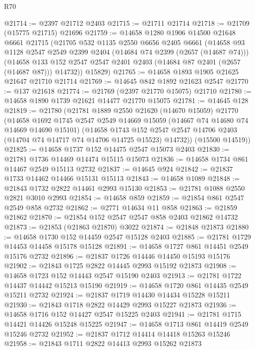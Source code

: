 \begin{lexlean}{R70}
\begin{coremodule}
@21714 := @2397 @21712 @2403
@21715 := @21711 @21714
@21718 := @21709 (@15775 @21715) @21696
@21759 := @14658
    @1280
    @1906
    @14500
    @21648
    @6661
    @21715
    (@21705
      @532
      @1135
      @2550
      @6656
      @2405
      @6661
      (@14658
        @93
        @1128
        @2547
        @2549
        @2399
        @2404
        (@14684 @74 @2399 (@2657 (@14687 @74)))
        (@14658 @133 @152 @2547 @2547 @2401 @2403 (@14684 @87 @2401 (@2657 (@14687 @87))) @14732))
      @15829)
@21765 := @14658 @1893 @1905 @21625 @21647 @21710 @21714
@21769 := @14645 @842 @1892 @21623 @2547
@21770 := @137 @21618
@21774 := @21769 (@2397 @21770 @15075) @21710
@21780 := @14658 @1890 @1739 @21621 @14477 @21770 @15075
@21781 := @14645 @128
@21819 := @21780
    (@21781
      @1889
      @2550
      @21620
      (@14670 @15059)
      @21770
      (@14658
        @1692
        @1745
        @2547
        @2549
        @14669
        @15059
        (@14667 @74 @14680 @74 @14669 @14690 @15101)
        (@14658
          @1743
          @152
          @2547
          @2547
          @14706
          @2403
          (@14704 @74 @14717 @74 @14706 @14725 @15523)
          @14732))
      (@15500 @14519))
@21825 := @14658 @1737 @152 @14475 @2547 @15073 @2403
@21830 := @21781 @1736 @14469 @14474 @15115 @15073
@21836 := @14658 @1734 @861 @14467 @2549 @15113 @2732
@21837 := @14645 @924
@21842 := @21837 @1733 @14462 @14466 @15131 @15113
@21843 := @14658 @1089
@21848 := @21843 @1732 @2822 @14461 @2993 @15130
@21853 := @21781 @1088 @2550 @2821 @3010 @2993
@21854 := @14658 @859
@21859 := @21854 @861 @2547 @2549 @858 @2732
@21862 := @2771 @14634 @11 @858
@21863 := @21859 @21862
@21870 := @21854 @152 @2547 @2547 @858 @2403 @21862 @14732
@21873 := @21853 (@21863 @21870) @3022
@21874 := @21848 @21873
@21880 := @14658 @1730 @152 @14459 @2547 @15128 @2403
@21885 := @21781 @1729 @14453 @14458 @15178 @15128
@21891 := @14658 @1727 @861 @14451 @2549 @15176 @2732
@21896 := @21837 @1726 @14446 @14450 @15193 @15176
@21902 := @21843 @1725 @2822 @14445 @2993 @15192 @21873
@21908 := @14658 @1723 @152 @14443 @2547 @15190 @2403
@21913 := @21781 @1722 @14437 @14442 @15213 @15190
@21919 := @14658 @1720 @861 @14435 @2549 @15211 @2732
@21924 := @21837 @1719 @14430 @14434 @15228 @15211
@21930 := @21843 @1718 @2822 @14429 @2993 @15227 @21873
@21936 := @14658 @1716 @152 @14427 @2547 @15225 @2403
@21941 := @21781 @1715 @14421 @14426 @15248 @15225
@21947 := @14658 @1713 @861 @14419 @2549 @15246 @2732
@21952 := @21837 @1712 @14414 @14418 @15263 @15246
@21958 := @21843 @1711 @2822 @14413 @2993 @15262 @21873

\end{coremodule}
\end{lexlean}
